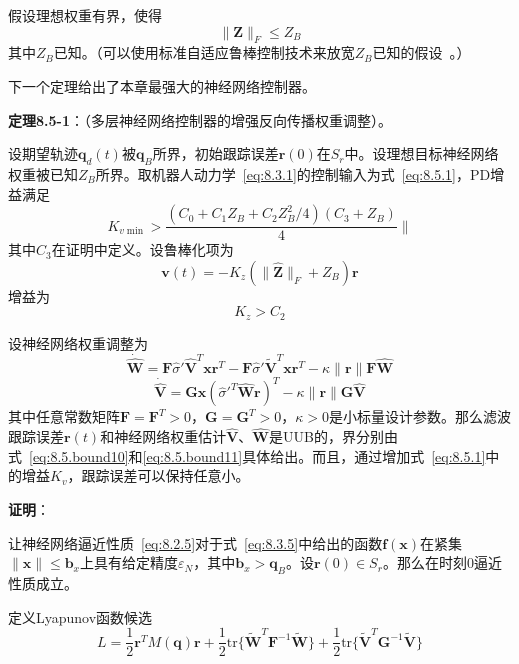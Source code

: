 \documentclass[12pt,a4paper]{ctexart}
\begin{document}
假设理想权重有界，使得
\begin{equation}\label{eq:8.5.6}
\|\bm{Z}\|_F \leq Z_B
\end{equation}
其中$Z_B$已知。（可以使用标准自适应鲁棒控制技术来放宽$Z_B$已知的假设~\cite{polycarpou1996}。）

下一个定理给出了本章最强大的神经网络控制器。

\textbf{定理8.5-1}：（多层神经网络控制器的增强反向传播权重调整）。

设期望轨迹$\bm{q}_d(t)$被$\bm{q}_B$所界，初始跟踪误差$\bm{r}(0)$在$S_r$中。设理想目标神经网络权重被已知$Z_B$所界。取机器人动力学~\eqref{eq:8.3.1}的控制输入为式~\eqref{eq:8.5.1}，PD增益满足
\begin{equation}\label{eq:8.5.cond1}
K_{v\min} > \frac{(C_0 + C_1 Z_B + C_2 Z_B^2/4)(C_3 + Z_B)}{4}\|
\end{equation}
其中$C_3$在证明中定义。设鲁棒化项为
\begin{equation}\label{eq:8.5.cond2}
\bm{v}(t) = -K_z(\|\hat{\bm{Z}}\|_F + Z_B)\bm{r}
\end{equation}
增益为
\begin{equation}\label{eq:8.5.cond3}
K_z > C_2
\end{equation}

设神经网络权重调整为
\begin{equation}\label{eq:8.5.cond4}
\dot{\hat{\bm{W}}} = \bm{F}\hat{\sigma}'\hat{\bm{V}}^T\bm{x}\bm{r}^T - \bm{F}\hat{\sigma}'\tilde{\bm{V}}^T\bm{x}\bm{r}^T - \kappa\|\bm{r}\|\bm{F}\hat{\bm{W}}
\end{equation}
\begin{equation}\label{eq:8.5.cond5}
\dot{\hat{\bm{V}}} = \bm{G}\bm{x}(\hat{\sigma}'^T\hat{\bm{W}}\bm{r})^T - \kappa\|\bm{r}\|\bm{G}\hat{\bm{V}}
\end{equation}
其中任意常数矩阵$\bm{F}=\bm{F}^T>0$，$\bm{G}=\bm{G}^T>0$，$\kappa>0$是小标量设计参数。那么滤波跟踪误差$\bm{r}(t)$和神经网络权重估计$\hat{\bm{V}}$、$\hat{\bm{W}}$是UUB的，界分别由式~\eqref{eq:8.5.bound10}和\eqref{eq:8.5.bound11}具体给出。而且，通过增加式~\eqref{eq:8.5.1}中的增益$K_v$，跟踪误差可以保持任意小。

\textbf{证明}：

让神经网络逼近性质~\eqref{eq:8.2.5}对于式~\eqref{eq:8.3.5}中给出的函数$\bm{f}(\bm{x})$在紧集$\|\bm{x}\| \leq \bm{b}_x$上具有给定精度$\varepsilon_N$，其中$\bm{b}_x > \bm{q}_B$。设$\bm{r}(0) \in S_r$。那么在时刻0逼近性质成立。

定义Lyapunov函数候选
\begin{equation}\label{eq:8.5.lyap6}
L = \frac{1}{2}\bm{r}^T M(\bm{q})\bm{r} + \frac{1}{2}\text{tr}\{\tilde{\bm{W}}^T \bm{F}^{-1} \tilde{\bm{W}}\} + \frac{1}{2}\text{tr}\{\tilde{\bm{V}}^T \bm{G}^{-1} \tilde{\bm{V}}\}
\end{equation}
\end{document}
